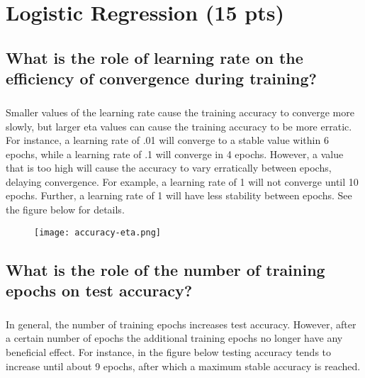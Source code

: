 \documentclass[11pt]{article}
\begin{document}
\thispagestyle{empty}

\newlength{\boxlength}\setlength{\boxlength}{\textwidth}
\addtolength{\boxlength}{-4mm}

\begin{center}
\end{center}




\section{Logistic Regression (15 pts)}

\subsection{What is the role of learning rate on the efficiency of convergence during training?}

\subparagraph{}

Smaller values of the learning rate cause the training accuracy to converge more slowly, but larger eta values can cause the training accuracy to be more erratic. For instance, a learning rate of .01 will converge to a stable value within 6 epochs, while a learning rate of .1 will converge in 4 epochs. However, a value that is too high will cause the accuracy to vary erratically between epochs, delaying convergence. For example, a learning rate of 1 will not converge until 10 epochs. Further, a learning rate of 1 will have less stability between epochs. See the figure below for details.

\begin{figure}[h]
	\texttt{[image: accuracy-eta.png]}
	\label{fig:graph}
\end{figure}

\subsection{What is the role of the number of training epochs on test accuracy?}

\subparagraph{}

In general, the number of training epochs increases test accuracy. However, after a certain number of epochs the additional training epochs no longer have any beneficial effect. For instance, in the figure below testing accuracy tends to increase until about 9 epochs, after which a maximum stable accuracy is reached.
\end{document}
